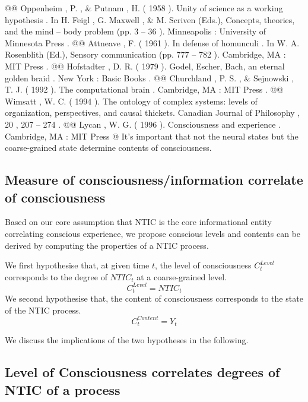 \documentclass[utf8]{article}
\begin{document}
\begin{WritingMaterials}
    				@@ Oppenheim , P. , \& Putnam , H. ( 1958 ). Unity of science as a working hypothesis . In H. Feigl , G. Maxwell , \& M. Scriven (Eds.), Concepts, theories, and the mind – body problem (pp. 3 – 36 ). Minneapolis : University of Minnesota Press .
    				@@ Attneave , F. ( 1961 ). In defense of homunculi . In W. A. Rosenblith (Ed.), Sensory communication (pp. 777 – 782 ). Cambridge, MA : MIT Press .
    				@@ Hofstadter , D. R. ( 1979 ). Godel, Escher, Bach, an eternal golden braid . New York : Basic Books .
    				@@ Churchland , P. S. , \& Sejnowski , T. J. ( 1992 ). The computational brain . Cambridge, MA : MIT Press .
    				@@ Wimsatt , W. C. ( 1994 ). The ontology of complex systems: levels of organization, perspectives, and causal thickets. Canadian Journal of Philosophy , 20 , 207 – 274 .
    				@@ Lycan ,  W. G.  ( 1996 ).  Consciousness and experience .  Cambridge, MA :  MIT Press
    			@ It's important that not the neural states but the coarse-grained state determine contents of consciousness.
    
            

		\end{WritingMaterials}


		\subsection{Measure of consciousness/information correlate of consciousness}	
		Based on our core assumption that NTIC is the core informational entity correlating conscious experience, we propose conscious levels and contents can be derived by computing the properties of a NTIC process. \newline
		
		\noindent
		We first hypothesise that, at given time $t$, the level of consciousness $C_{t}^{Level}$ corresponds to the degree of $NTIC_{t}$ at a coarse-grained level.
			\begin{equation}\label{eq:cLevel}
				C_{t}^{Level} = NTIC_{t}
			\end{equation}
		\newline
		\noindent
		We second hypothesise that, the content of consciousness corresponds to the state of the NTIC process.
			\begin{equation}\label{eq:cContent}
				C_{t}^{Content} = Y_{t}
			\end{equation}
		
		We discuss the implications of the two hypotheses in the following. 	
	    \subsection{Level of Consciousness correlates degrees of NTIC of a process}
	    
\end{document}
